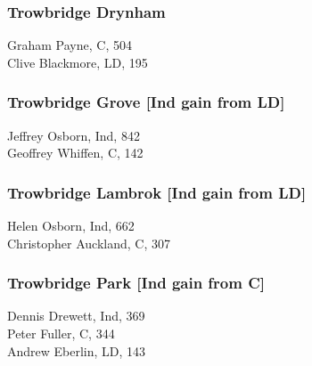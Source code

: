 \documentclass[a4paper,openany,10pt]{book}
\begin{document}
\subsubsection*{Trowbridge Drynham}



Graham Payne, C, 504\\
Clive Blackmore, LD, 195\\


\subsubsection*{Trowbridge Grove \hspace*{\fill}\nolinebreak[1]%
\enspace\hspace*{\fill}
[Ind gain from LD]}



Jeffrey Osborn, Ind, 842\\
Geoffrey Whiffen, C, 142\\


\subsubsection*{Trowbridge Lambrok \hspace*{\fill}\nolinebreak[1]%
\enspace\hspace*{\fill}
[Ind gain from LD]}



Helen Osborn, Ind, 662\\
Christopher Auckland, C, 307\\


\subsubsection*{Trowbridge Park \hspace*{\fill}\nolinebreak[1]%
\enspace\hspace*{\fill}
[Ind gain from C]}



Dennis Drewett, Ind, 369\\
Peter Fuller, C, 344\\
Andrew Eberlin, LD, 143\\
\end{document}
